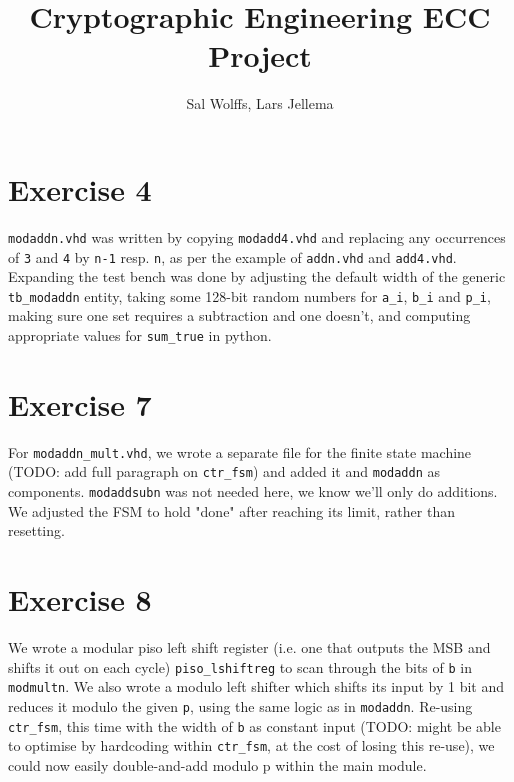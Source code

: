 \documentclass[a4paper,twoside]{article}
\title{Cryptographic Engineering ECC Project}
\author{Sal Wolffs, Lars Jellema}
\newcommand{\atom}[1]{\mbox{\texttt{#1}}}
\begin{document}
\maketitle

\section*{Exercise 4} 
\atom{modaddn.vhd} was written by copying \atom{modadd4.vhd} and replacing any
occurrences of \atom{3} and \atom{4} by \atom{n-1} resp. \atom{n}, as per the
example of \atom{addn.vhd} and \atom{add4.vhd}. Expanding the test bench was
done by adjusting the default width of the generic \atom{tb\_modaddn} entity,
taking some 128-bit random numbers for \atom{a\_i}, \atom{b\_i} and \atom{p\_i},
making sure one set requires a subtraction and one doesn't, and computing
appropriate values for \atom{sum\_true} in python.

\section*{Exercise 7}
For \atom{modaddn\_mult.vhd}, we wrote a separate file for the finite state
machine (TODO: add full paragraph on \atom{ctr\_fsm}) and added it and
\atom{modaddn} as components. \atom{modaddsubn} was not needed here, we know
we'll only do additions. We adjusted the FSM to hold "done" after reaching its
limit, rather than resetting. 

\section*{Exercise 8}
We wrote a modular piso left shift register (i.e. one that outputs the MSB and
shifts it out on each cycle) \atom{piso\_lshiftreg} to scan through the bits of
\atom{b} in \atom{modmultn}. We also wrote a modulo left shifter which shifts
its input by 1 bit and reduces it modulo the given \atom{p}, using the same
logic as in \atom{modaddn}. Re-using \atom{ctr\_fsm}, this time with the width
of \atom{b} as constant input (TODO: might be able to optimise by hardcoding
within \atom{ctr\_fsm}, at the cost of losing this re-use), we could now easily
double-and-add modulo p within the main module.
\end{document}
